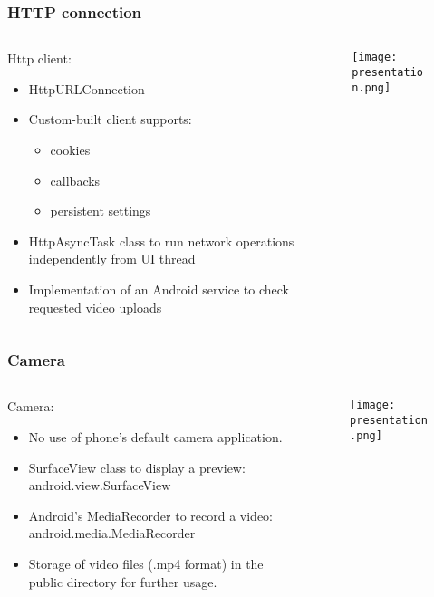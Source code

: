 \begin{frame}	
	\frametitle{HTTP connection}
	\begin{columns}[t]
		\begin{column}[t]{0.5\linewidth}
			Http client:
			\begin{itemize}
				\item HttpURLConnection
				\item Custom-built client supports:
				\begin{itemize}
					\item cookies
					\item callbacks
					\item persistent settings					
				\end{itemize} 
				\item HttpAsyncTask class to run network operations independently from UI thread
				\item Implementation of an Android service to check requested video uploads
			\end{itemize}
		\end{column}
		\begin{column}[t]{0.5\linewidth}
			\begin{figure}[!t]
				\centering
				\texttt{[image: presentation.png]}
				\label{fig:http}
			\end{figure}
			
		\end{column}		
	\end{columns}	
\end{frame}

\begin{frame}	
	\frametitle{Camera}
	\begin{columns}[t]
		\begin{column}[t]{0.5\linewidth}
			Camera:
			\begin{itemize}
				\item No use of phone's default camera application.
				\item SurfaceView class to display a preview: android.view.SurfaceView
				\item Android's MediaRecorder to record a video: android.media.MediaRecorder
				\item Storage of video files (.mp4 format) in the public directory for further usage. 
			\end{itemize}
		\end{column}
		\begin{column}[t]{0.5\linewidth}
			\begin{figure}[!t]
				\centering
				\texttt{[image: presentation.png]}
				\label{fig:camera}
			\end{figure}
			
		\end{column}		
	\end{columns}	
\end{frame}

